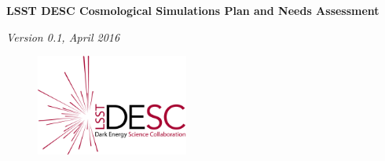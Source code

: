 \documentclass[12pt]{report}
\begin{document}
\pagestyle{empty}

\vspace*{0.3\textheight}

\begin{center}
{\Huge\bfseries LSST DESC Cosmological Simulations Plan and Needs Assessment}
\end{center}

\vspace*{0.1\textheight}

\begin{center}
{\it Version 0.1, April 2016}
\end{center}

\begin{figure}[!b]
\centering\includegraphics[width=5cm,angle=0]{desc-logo.png}
\end{figure}

\clearpage
\maketoc
\label{toc}
\clearpage

\pagestyle{fancy}
\fancyfoot{} %
\fancyfoot[R]{\thepage}  %
\fancyfoot[L]{\footernavigationbar}  %

\fancyhead[L]{}
\fancyhead[R]{\docheader}
\renewcommand{\footrulewidth}{1pt}















% 

% 


\nocite{*}


\end{document}
